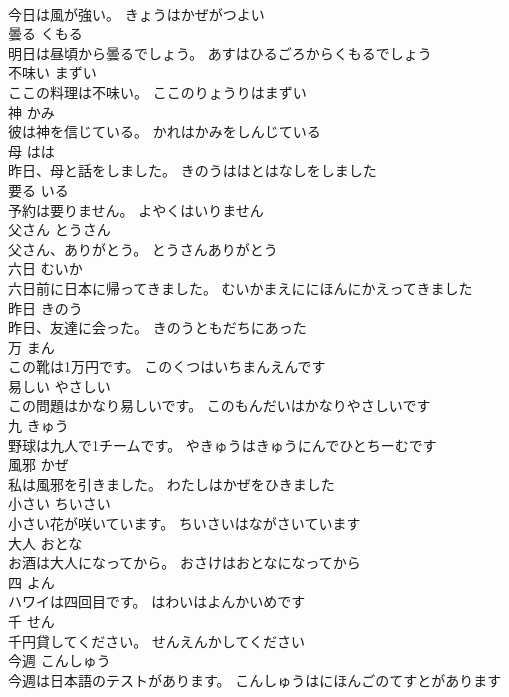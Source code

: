 \documentclass[8pt]{extreport}
\begin{document}
\begin{CJK}{UTF8}{min}
\\	今日は風が強い。	きょうはかぜがつよい	
\\	曇る	くもる	
\\	明日は昼頃から曇るでしょう。	あすはひるごろからくもるでしょう	
\\	不味い	まずい	
\\	ここの料理は不味い。	ここのりょうりはまずい	
\\	神	かみ	
\\	彼は神を信じている。	かれはかみをしんじている	
\\	母	はは	
\\	昨日、母と話をしました。	きのうははとはなしをしました	
\\	要る	いる	
\\	予約は要りません。	よやくはいりません	
\\	父さん	とうさん	
\\	父さん、ありがとう。	とうさんありがとう	
\\	六日	むいか	
\\	六日前に日本に帰ってきました。	むいかまえににほんにかえってきました	
\\	昨日	きのう	
\\	昨日、友達に会った。	きのうともだちにあった	
\\	万	まん	
\\	この靴は1万円です。	このくつはいちまんえんです	
\\	易しい	やさしい	
\\	この問題はかなり易しいです。	このもんだいはかなりやさしいです	
\\	九	きゅう	
\\	野球は九人で1チームです。	やきゅうはきゅうにんでひとちーむです	
\\	風邪	かぜ	
\\	私は風邪を引きました。	わたしはかぜをひきました	
\\	小さい	ちいさい	
\\	小さい花が咲いています。	ちいさいはながさいています	
\\	大人	おとな	
\\	お酒は大人になってから。	おさけはおとなになってから	
\\	四	よん	
\\	ハワイは四回目です。	はわいはよんかいめです	
\\	千	せん	
\\	千円貸してください。	せんえんかしてください	
\\	今週	こんしゅう	
\\	今週は日本語のテストがあります。	こんしゅうはにほんごのてすとがあります	

\end{CJK}
\end{document}
